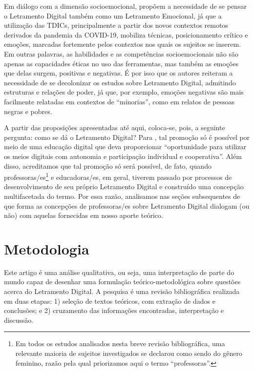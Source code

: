 \documentclass[portuguese]{textolivre}
\begin{document}
Em diálogo com a dimensão socioemocional, \textcite{tagata_rethinking_2021} propõem a necessidade de se pensar o Letramento Digital também como um Letramento Emocional, já que a utilização das TDICs, principalmente a partir dos novos contextos remotos derivados da pandemia da COVID-19, mobiliza técnicas, posicionamento crítico e emoções, marcadas fortemente pelos contextos nos quais os sujeitos se inserem. Em outras palavras, as habilidades e as competências socioemocionais não são apenas as capacidades éticas no uso das ferramentas, mas também as emoções que delas surgem, positivas e negativas. É por isso que os autores reiteram a necessidade de se decolonizar os estudos sobre Letramento Digital, admitindo estruturas e relações de poder, já que, por exemplo, emoções negativas são mais facilmente relatadas em contextos de “minorias”, como em relatos de pessoas negras e pobres.

A partir das proposições apresentadas até aqui, coloca-se, pois, a seguinte pergunta: como se dá o Letramento Digital? Para \textcite[p.~13]{rezende_o_2016}, tal promoção só é possível por meio de uma educação digital que deva proporcionar “oportunidade para utilizar os meios digitais com autonomia e participação individual e cooperativa”. Além disso, acreditamos que tal promoção só será possível, de fato, quando professoras/es\footnote{Em todos os estudos analisados nesta breve revisão bibliográfica, uma relevante maioria de sujeitos investigados se declarou como sendo do gênero feminino, razão pela qual priorizamos aqui o termo “professoras”.} e educadoras/es, em geral, tiverem passado por processos de desenvolvimento de seu próprio Letramento Digital e construído uma concepção multifacetada do termo. Por essa razão, analisamos nas seções subsequentes de que forma as concepções de professoras/es sobre Letramento Digital dialogam (ou não) com aquelas fornecidas em nosso aporte teórico.

\section{Metodologia}

Este artigo é uma análise qualitativa, ou seja, uma interpretação de parte do mundo capaz de desenhar uma formulação teórico-metodológica \cite{ramalho_alise_2011} sobre questões acerca do Letramento Digital. A pesquisa é uma revisão bibliográfica realizada em duas etapas: 1) seleção de textos teóricos, com extração de dados e conclusões; e 2) cruzamento das informações encontradas, interpretação e discussão.
\end{document}
